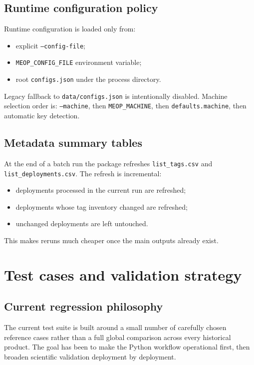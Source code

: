 \documentclass[11pt,a4paper]{article}
\newcommand{\pkg}[1]{\texttt{#1}}
\begin{document}
\subsection{Runtime configuration policy}

Runtime configuration is loaded only from:

\begin{itemize}[leftmargin=1.5em]
  \item explicit \pkg{--config-file};
  \item \pkg{MEOP\_CONFIG\_FILE} environment variable;
  \item root \pkg{configs.json} under the process directory.
\end{itemize}

Legacy fallback to \pkg{data/configs.json} is intentionally disabled. Machine selection order is: \pkg{--machine}, then \pkg{MEOP\_MACHINE}, then \pkg{defaults.machine}, then automatic key detection.

\subsection{Metadata summary tables}

At the end of a batch run the package refreshes \pkg{list\_tags.csv} and \pkg{list\_deployments.csv}. The refresh is incremental:

\begin{itemize}[leftmargin=1.5em]
  \item deployments processed in the current run are refreshed;
  \item deployments whose tag inventory changed are refreshed;
  \item unchanged deployments are left untouched.
\end{itemize}

This makes reruns much cheaper once the main outputs already exist.

\section{Test cases and validation strategy}

\subsection{Current regression philosophy}

The current test suite is built around a small number of carefully chosen reference cases rather than a full global comparison across every historical product. The goal has been to make the Python workflow operational first, then broaden scientific validation deployment by deployment.
\end{document}
